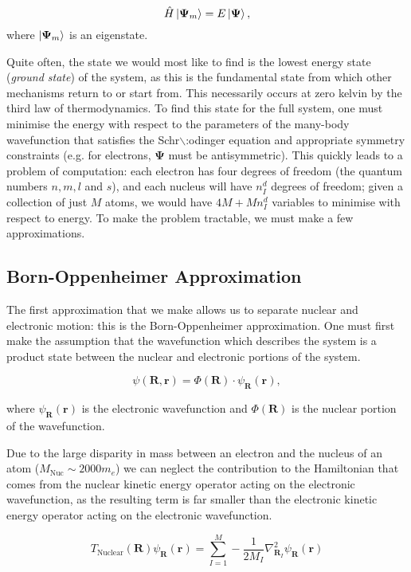 \documentclass[11pt]{article}
\begin{document}
\[ \hat{H}\ket{\mathbf{\Psi}_m} = E \ket{\mathbf{\Psi}}, \]
where \(\ket{\mathbf{\Psi}_m}\) is an eigenstate.

Quite often, the state we would most like to find is the lowest energy state (\emph{ground state})
of the system, as this is the fundamental state from which other mechanisms return to or start
from. This necessarily occurs at zero kelvin by the third law of thermodynamics. To find this
state for the full system, one must minimise the energy with respect to the parameters of the
many-body wavefunction that satisfies the Schr$\backslash$:odinger equation and appropriate symmetry
constraints (e.g. for electrons, \(\mathbf{\Psi}\) must be antisymmetric). This quickly leads to
a problem of computation: each electron has four degrees of freedom (the quantum numbers \(n, m,
l\) and \(s\)), and each nucleus will have \(n^d_I\) degrees of freedom; given a collection of
just \(M\) atoms, we would have \(4M + Mn^d_I\) variables to minimise with respect to energy. To
make the problem tractable, we must make a few approximations.

\subsection{Born-Oppenheimer Approximation}
\label{sec:org8f6526e}

The first approximation that we make allows us to separate nuclear and electronic motion: this is the
Born-Oppenheimer approximation. One must first make the assumption that the
wavefunction which describes the system is a product state between the nuclear and electronic
portions of the system.

\[ \psi(\mathbf{R}, \mathbf{r}) = \Phi(\mathbf{R}) \cdot \psi_{\mathbf{R}}(\mathbf{r}), \]

where \(\psi_{\mathbf{R}}(\mathbf{r})\) is the electronic wavefunction and \(\Phi(\mathbf{R})\) is
the nuclear portion of the wavefunction.

Due to the large disparity in mass between an electron and the nucleus of an atom (\(M_\text{Nuc} \sim
2000 m_e\)) we can neglect the contribution to the Hamiltonian that comes from the nuclear
kinetic energy operator acting on the electronic wavefunction, as the resulting term is far
smaller than the electronic kinetic energy operator acting on the electronic wavefunction.

\[T_{\text{Nuclear}}(\mathbf{R}) \psi_{\mathbf{R}}(\mathbf{r}) = \sum_{I =
1}^{M} - \frac{1}{2M_{I}} \nabla^{2}_{\mathbf{R}_{I}} \psi_{\mathbf{R}}(\mathbf{r})\]
\end{document}
